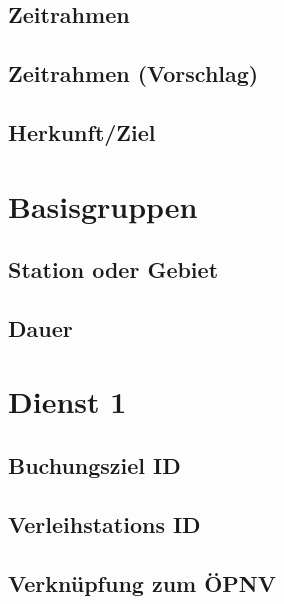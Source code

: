 \subsection*{Zeitrahmen}


\subsection*{Zeitrahmen (Vorschlag)}


\subsection*{Herkunft/Ziel}


\section{Basisgruppen}

\subsection*{Station oder Gebiet}


\subsection*{Dauer}


\section{Dienst 1}
\label{subsec:Datenmodell:Dienst1}

\subsection*{Buchungsziel ID}


\subsection*{Verleihstations ID}


\subsection*{Verknüpfung zum ÖPNV}


